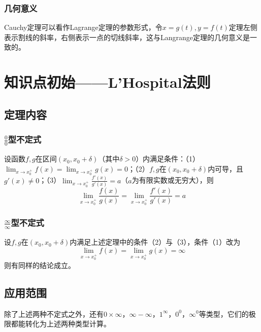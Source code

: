 \subsubsection{几何意义}
Cauchy定理可以看作Lagrange定理的参数形式，令$x=g(t),y=f(t)$定理左侧表示割线的斜率，右侧表示一点的切线斜率，这与Langrange定理的几何意义是一致的。

\section{知识点初始——L'Hospital法则}\label{sec:4.4}

\subsection{定理内容}\label{sec:4.4.1}

\subsubsection{$\frac{0}{0}$型不定式}

\begin{theorem}
	设函数$f,g$在区间$(x_0,x_0+\delta)$（其中$\delta>0$）内满足条件：（1）$\lim_{x\to x_0^+}f(x)=\lim_{x\to x_0^+}g(x)=0$；（2）$f,g$在$(x_0,x_0+\delta)$内可导，且$g'(x)\neq 0$；（3）$\lim_{x\to x_0^+}\frac{f'(x)}{g'(x)}=a$（$a$为有限实数或无穷大），则
	\begin{equation}
		\lim_{x\to x_0^+}\frac{f(x)}{g(x)}=\lim_{x\to x_0^+}\frac{f'(x)}{g'(x)}=a\label{eq:4.4}
	\end{equation}
\end{theorem}

\subsubsection{$\frac{\infty}{\infty}$型不定式}

\begin{theorem}
	设$f,g$在$(x_0,x_0+\delta)$内满足上述定理中的条件（2）与（3），条件（1）改为
	\[\lim_{x\to x_0^+}f(x)=\lim_{x\to x_0^+}g(x)=\infty\]
	则有同样的结论成立。
\end{theorem}

\subsection{应用范围}

除了上述两种不定式之外，还有$0\times\infty$，$\infty -\infty$，$1^\infty$，$0^0$，$\infty ^0$等类型，它们的极限都能转化为上述两种类型计算。

